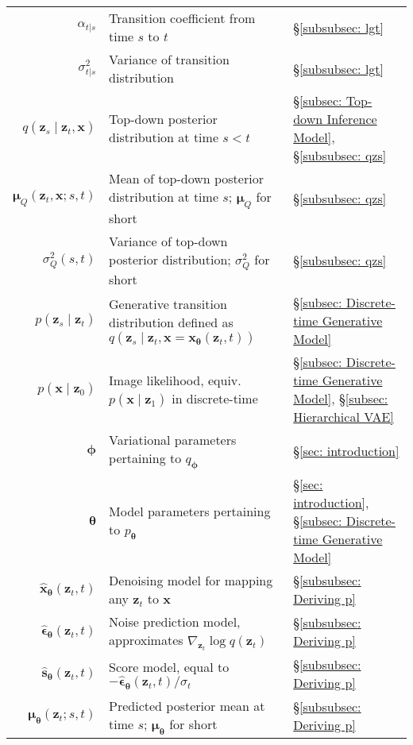 \begin{table}[!h]
\begin{tabular}{rll}
        $\alpha_{t|s}$ & Transition coefficient from time $s$ to $t$ & \S\ref{subsubsec: lgt} \\[5pt]
        $\sigma^2_{t|s}$ & Variance of transition distribution & \S\ref{subsubsec: lgt} \\[5pt]
        $q(\mathbf{z}_s \mid \mathbf{z}_t, \mathbf{x})$ & Top-down posterior distribution at time $s < t$ & \S\ref{subsec: Top-down Inference Model}, \S\ref{subsubsec: qzs} \\[5pt]
        $\boldsymbol{\mu}_Q(\mathbf{z}_t, \mathbf{x};s,t)$ & Mean of top-down posterior distribution at time $s$; $\boldsymbol{\mu}_Q$ for short & \S\ref{subsubsec: qzs} \\[5pt]
        $\sigma^2_Q(s,t)$ & Variance of top-down posterior distribution; $\sigma^2_Q$ for short & \S\ref{subsubsec: qzs} \\[5pt]
        $p(\mathbf{z}_s \mid \mathbf{z}_t)$ & Generative transition distribution defined as $q(\mathbf{z}_s \mid \mathbf{z}_t, \mathbf{x}=\hat{\mathbf{x}}_{\boldsymbol{\theta}}(\mathbf{z}_t, t))$ & \S\ref{subsec: Discrete-time Generative Model} \\[5pt]
        $p(\mathbf{x} \mid \mathbf{z}_0)$ & Image likelihood, equiv. $p(\mathbf{x} \mid \mathbf{z}_1)$ in discrete-time & \S\ref{subsec: Discrete-time Generative Model}, \S\ref{subsec: Hierarchical VAE} \\[5pt]
        $\boldsymbol{\phi}$ & Variational parameters pertaining to $q_{\boldsymbol{\phi}}$ & \S\ref{sec: introduction} 
        \\[5pt]
        $\boldsymbol{\theta}$ & Model parameters pertaining to $p_{\boldsymbol{\theta}}$ & \S\ref{sec: introduction}, \S\ref{subsec: Discrete-time Generative Model} \\[5pt]
        $\hat{\mathbf{x}}_{\boldsymbol{\theta}}(\mathbf{z}_t, t)$ & Denoising model for mapping any $\mathbf{z}_t$ to $\mathbf{x}$ & \S\ref{subsubsec: Deriving p} \\[5pt]
        $\hat{\boldsymbol{\epsilon}}_{\boldsymbol{\theta}}(\mathbf{z}_t, t)$ & Noise prediction model, approximates $\nabla_{\mathbf{z}_t} \log q(\mathbf{z}_t)$ & \S\ref{subsubsec: Deriving p} \\[5pt]
        $\hat{\mathbf{s}}_{\boldsymbol{\theta}}(\mathbf{z}_t, t)$ & Score model, equal to $-\hat{\boldsymbol{\epsilon}}_{\boldsymbol{\theta}}(\mathbf{z}_t, t) / \sigma_t$ & \S\ref{subsubsec: Deriving p} \\[5pt]
        $\boldsymbol{\mu}_{\boldsymbol{\theta}}(\mathbf{z}_t;s,t)$ & Predicted posterior mean at time $s$; $\boldsymbol{\mu}_{\boldsymbol{\theta}}$ for short & \S\ref{subsubsec: Deriving p} \\[5pt]

\end{tabular}
\end{table}
